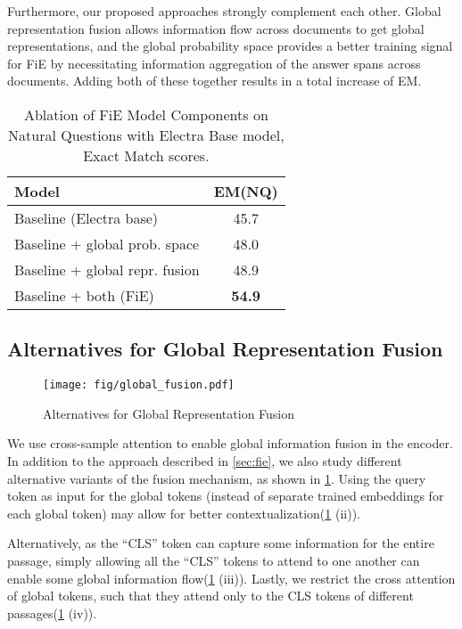 \documentclass[11pt]{article}
\begin{document}
Furthermore, our proposed approaches strongly complement each other. Global representation fusion allows information flow across documents to get global representations, and the global probability space provides a better training signal for FiE by necessitating information aggregation of the answer spans across documents. Adding both of these together results in a total increase of  EM.

\begin{table}[h!]
\begin{center}
\begin{tabular}{lc}
\toprule
\textbf{Model} & \textbf{EM(NQ)}\\ 
\toprule
Baseline (Electra base) & 45.7 \\
Baseline + global prob. space & 48.0 \\
Baseline + global repr. fusion & 48.9 \\
Baseline + both (FiE) & \textbf{54.9} \\
\bottomrule
\end{tabular}
\end{center}
\caption{Ablation of FiE Model Components on Natural Questions with Electra Base model, Exact Match scores.}
\label{tab_ablation}
\end{table}



\subsection{Alternatives for Global Representation Fusion}
\begin{figure}[hbt]
\texttt{[image: fig/global\_fusion.pdf]} 
\caption{Alternatives for Global Representation Fusion}
\label{global_fusion}
\end{figure}

We use cross-sample attention to enable global information fusion in the encoder. In addition to the approach described in \cref{sec:fie}, we also study different alternative variants of the fusion mechanism, as shown in \cref{global_fusion}. Using the query token as input for the global tokens (instead of separate trained embeddings for each global token) may allow for better contextualization(\cref{global_fusion} (ii)). 

Alternatively, as the ``CLS'' token can capture some information for the entire passage, simply allowing all the ``CLS'' tokens to attend to one another can enable some global information flow(\cref{global_fusion} (iii)). Lastly, we restrict the cross attention of global tokens, such that they attend only to the CLS tokens of different passages(\cref{global_fusion} (iv)).
\end{document}
